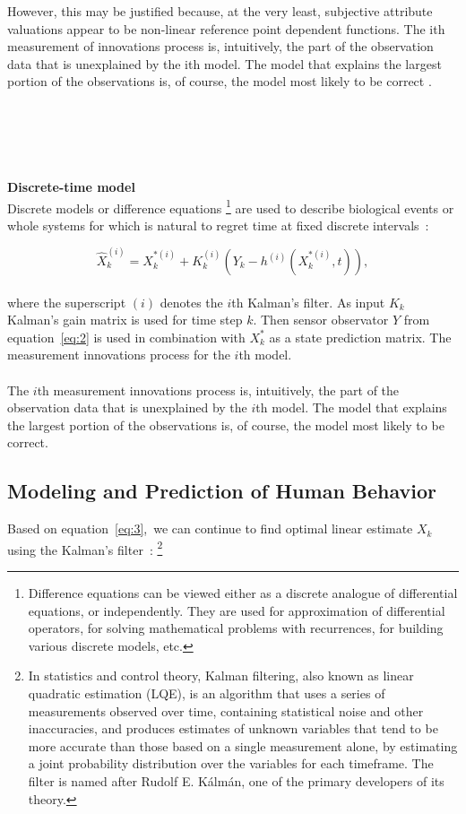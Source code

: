 However, this may be justified because, at the very least, subjective attribute valuations appear to be non-linear reference point dependent functions.
The ith measurement of innovations process is, intuitively, the part of the observation data that is unexplained by the ith model.
The model that explains the largest portion of the observations is, of course, the model most likely to be correct .\\
\\
\\
\\
\\
\\
\textbf{Discrete-time model} \label{subsec:discrete}\\
Discrete models or difference equations \footnote{Difference equations can be viewed either as a discrete analogue of differential equations, or independently.
They are used for approximation of differential operators, for solving mathematical problems with recurrences, for building various discrete
models, etc.} are used to describe biological events or whole systems for which is natural to regret time at fixed discrete intervals~\cite{pantland}:

\begin{equation} \label{eq:3}
\hat{X}_{k}^{(i)} = X_{k}^{*(i)} + K_k^{(i)}(Y_k - h^{(i)}(X_{k}^{*(i)},t)),
\end{equation}
\\
where the superscript $(i)$ denotes the $i$th Kalman's filter.
As input $K_k$ Kalman's gain matrix is used for time step $k$.
Then sensor observator $Y$ from equation~\ref{eq:2} is used in combination with $X_{k}^{*}$ as a state prediction matrix.
The measurement innovations process for the $i$th model.\\
\\
The $i$th measurement innovations process is, intuitively, the part of the observation data that is unexplained by the $i$th model.
The model that explains the largest portion of the observations is, of course, the model most likely to be correct.\\

\subsection{Modeling and Prediction of Human Behavior} \label{subsec:prediction}
Based on equation~\ref{eq:3},\ we can continue to find optimal linear estimate $X_k$ using the Kalman's filter~\cite{pantland}: \footnote{In statistics
and control theory, Kalman filtering, also known as linear quadratic estimation (LQE), is an algorithm that
uses a series of measurements observed over time, containing statistical noise and other inaccuracies, and produces
estimates of unknown variables that tend to be more accurate than those based on a single measurement alone, by estimating
a joint probability distribution over the variables for each timeframe.
The filter is named after Rudolf E. Kálmán, one of the primary developers of its theory.}

